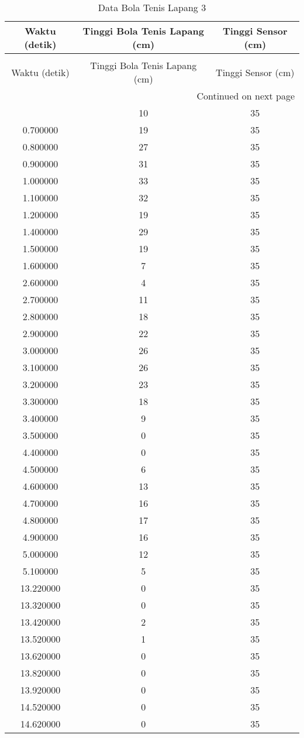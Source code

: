\begin{longtable}[htbp]{|c|c|c|}
\caption{Data Bola Tenis Lapang 3} \\
\hline
Waktu (detik) & Tinggi Bola Tenis Lapang (cm) & Tinggi Sensor (cm) \\ \hline
\endfirsthead
\caption[]{Data Bola Tenis Lapang 3} \\
\hline
Waktu (detik) & Tinggi Bola Tenis Lapang (cm) & Tinggi Sensor (cm) \\ \hline
\endhead
\multicolumn{3}{r}{Continued on next page} \\
\endfoot
\endlastfoot
0.600000 & 10 & 35 \\ \hline
0.700000 & 19 & 35 \\ \hline
0.800000 & 27 & 35 \\ \hline
0.900000 & 31 & 35 \\ \hline
1.000000 & 33 & 35 \\ \hline
1.100000 & 32 & 35 \\ \hline
1.200000 & 19 & 35 \\ \hline
1.400000 & 29 & 35 \\ \hline
1.500000 & 19 & 35 \\ \hline
1.600000 & 7 & 35 \\ \hline
2.600000 & 4 & 35 \\ \hline
2.700000 & 11 & 35 \\ \hline
2.800000 & 18 & 35 \\ \hline
2.900000 & 22 & 35 \\ \hline
3.000000 & 26 & 35 \\ \hline
3.100000 & 26 & 35 \\ \hline
3.200000 & 23 & 35 \\ \hline
3.300000 & 18 & 35 \\ \hline
3.400000 & 9 & 35 \\ \hline
3.500000 & 0 & 35 \\ \hline
4.400000 & 0 & 35 \\ \hline
4.500000 & 6 & 35 \\ \hline
4.600000 & 13 & 35 \\ \hline
4.700000 & 16 & 35 \\ \hline
4.800000 & 17 & 35 \\ \hline
4.900000 & 16 & 35 \\ \hline
5.000000 & 12 & 35 \\ \hline
5.100000 & 5 & 35 \\ \hline
13.220000 & 0 & 35 \\ \hline
13.320000 & 0 & 35 \\ \hline
13.420000 & 2 & 35 \\ \hline
13.520000 & 1 & 35 \\ \hline
13.620000 & 0 & 35 \\ \hline
13.820000 & 0 & 35 \\ \hline
13.920000 & 0 & 35 \\ \hline
14.520000 & 0 & 35 \\ \hline
14.620000 & 0 & 35 \\ \hline
\end{longtable}
